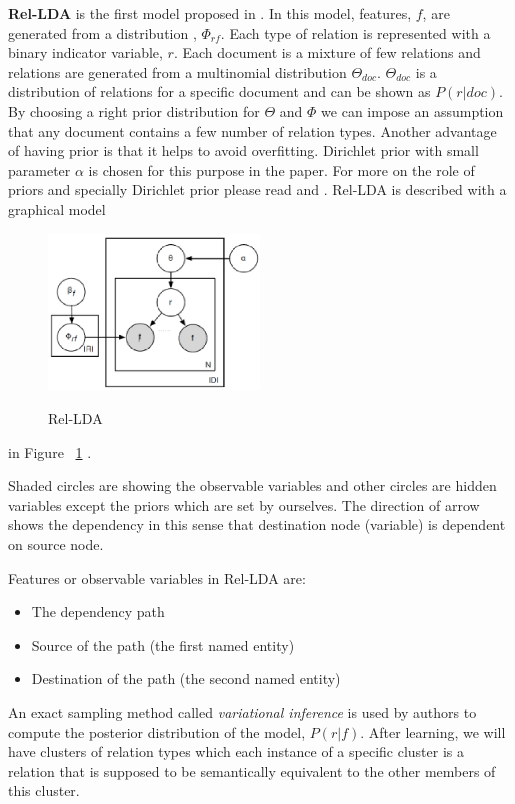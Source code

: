 \textbf{Rel-LDA} is the first model proposed in \cite{Riedel2013}. 
In this model, features, $f$, are generated from a distribution , $\Phi_{rf}$. Each type
 of relation is represented with a binary indicator variable, $r$. Each document is a mixture of few relations
  and relations are generated from a multinomial distribution $\Theta_{doc}$. $\Theta_{doc}$ is a distribution
  of relations for a specific document and can be shown as $P(r|doc)$. By choosing a right prior distribution for $\Theta$
   and $\Phi$ we can impose an assumption that any document contains a few number of relation types. 
   Another advantage of having prior is that it helps to avoid overfitting. Dirichlet prior with small parameter $\alpha$ is 
   chosen for this purpose in the paper. For more on the role of priors and specially Dirichlet prior
    please read \cite{Teh2007} and \cite{Gershman2012} .
    Rel-LDA is described with a graphical model 
     \begin{figure}[h!]
  \caption{Rel-LDA}
  \centering
    \includegraphics[width=0.5\textwidth]{rel-lda.eps}
    \label{fig:rel-lda}
\end{figure} in Figure ~\ref{fig:rel-lda} .
     
    Shaded circles are showing the observable variables and other circles are hidden variables except 
    the priors which are set by ourselves. The direction of arrow shows the dependency in this sense 
    that destination node (variable) is dependent on source node.
      
    Features or observable variables in Rel-LDA are:
    \begin{itemize}
      \item The dependency path
      \item Source of the path (the first named entity)
      \item Destination of the path (the second named entity)
    \end{itemize}
   	
   	An exact sampling method called \emph{variational inference} is used by authors to compute 
   	the posterior distribution of the model, $P(r|f)$.
   	After learning, we will have clusters of relation types which each instance of a specific cluster 
   	is a relation that is supposed to be semantically equivalent to the other members of this cluster.
   	\\
   	
